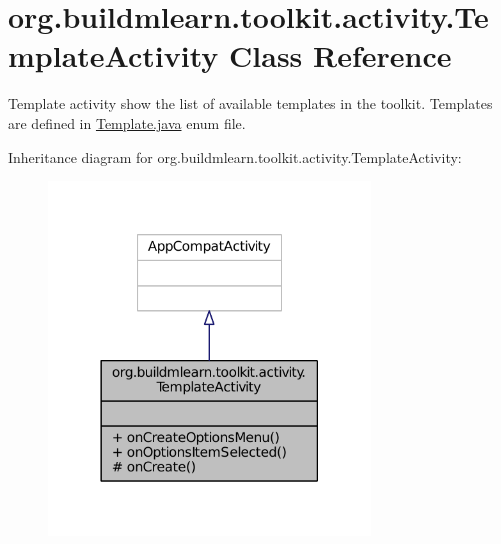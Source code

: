 \hypertarget{classorg_1_1buildmlearn_1_1toolkit_1_1activity_1_1TemplateActivity}{\section{org.\-buildmlearn.\-toolkit.\-activity.\-Template\-Activity Class Reference}
\label{classorg_1_1buildmlearn_1_1toolkit_1_1activity_1_1TemplateActivity}
}


Template activity show the list of available templates in the toolkit. Templates are defined in \hyperlink{Template_8java}{Template.\-java} enum file.  




Inheritance diagram for org.\-buildmlearn.\-toolkit.\-activity.\-Template\-Activity\-:
\nopagebreak
\begin{figure}[H]
\begin{center}
\leavevmode
\includegraphics[width=242pt]{de/d3f/classorg_1_1buildmlearn_1_1toolkit_1_1activity_1_1TemplateActivity__inherit__graph}
\end{center}
\end{figure}


